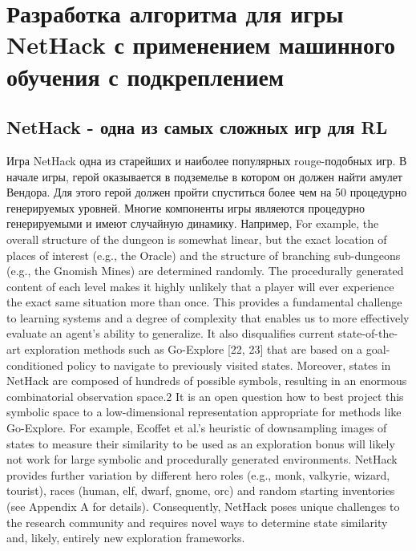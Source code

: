 \chapter{Разработка алгоритма для игры NetHack с применением машинного обучения с подкреплением}\label{ch:ch3}

\section{NetHack - одна из самых сложных игр для RL}

Игра NetHack одна из старейших и наиболее популярных rouge-подобных игр. В начале игры, герой оказывается в подземелье в котором он должен найти амулет Вендора. Для этого герой должен пройти спуститься более чем на 50 процедурно генерируемых уровней. Многие компоненты игры являеются процедурно генерируемыми и имеют случайную динамику. Например,  For example,
the overall structure of the dungeon is somewhat linear, but the exact location of places of interest (e.g.,
the Oracle) and the structure of branching sub-dungeons (e.g., the Gnomish Mines) are determined
randomly. The procedurally generated content of each level makes it highly unlikely that a player
will ever experience the exact same situation more than once. This provides a fundamental challenge
to learning systems and a degree of complexity that enables us to more effectively evaluate an
agent’s ability to generalize. It also disqualifies current state-of-the-art exploration methods such as
Go-Explore [22, 23] that are based on a goal-conditioned policy to navigate to previously visited states. Moreover, states in NetHack are composed of hundreds of possible symbols, resulting in an
enormous combinatorial observation space.2
It is an open question how to best project this symbolic
space to a low-dimensional representation appropriate for methods like Go-Explore. For example,
Ecoffet et al.’s heuristic of downsampling images of states to measure their similarity to be used as an
exploration bonus will likely not work for large symbolic and procedurally generated environments.
NetHack provides further variation by different hero roles (e.g., monk, valkyrie, wizard, tourist),
races (human, elf, dwarf, gnome, orc) and random starting inventories (see Appendix A for details).
Consequently, NetHack poses unique challenges to the research community and requires novel ways
to determine state similarity and, likely, entirely new exploration frameworks.

